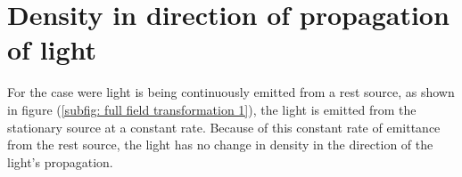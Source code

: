 







\section{Density in direction of propagation of light}\label{sect: Density in direction of propagation of light}


For the case were light is being continuously emitted from a rest source, as shown in figure (\ref{subfig: full field transformation 1}), the light is emitted from the stationary source at a constant rate.
Because of this constant rate of emittance from the rest source, the light has no change in density in the direction of the light's propagation.

